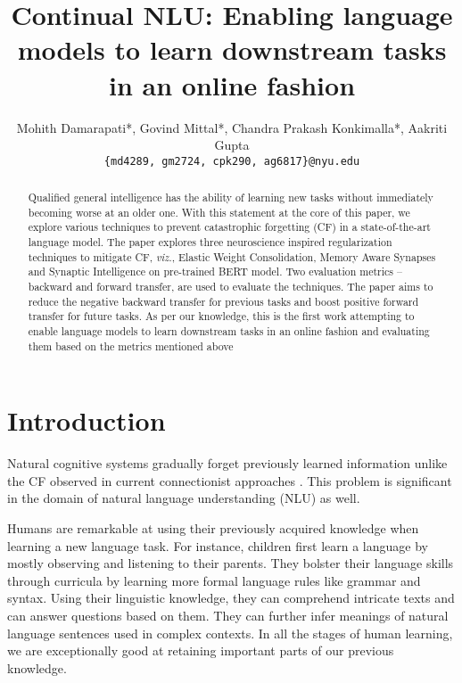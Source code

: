 \documentclass[11pt,a4paper]{article}
\title{Continual NLU: Enabling language models to learn downstream tasks in an online fashion}
\author{{Mohith Damarapati*, Govind Mittal*, Chandra Prakash Konkimalla*, Aakriti Gupta}\\
  {\tt \{md4289, gm2724, cpk290, ag6817\}@nyu.edu}}
\date{}
\begin{document}
\maketitle
\begin{abstract}
  Qualified general intelligence has the ability of learning new tasks without immediately becoming worse at an older one. With this statement at the core of this paper, we explore various techniques to prevent catastrophic forgetting (CF) in a state-of-the-art language model. The paper explores three neuroscience inspired regularization techniques to mitigate CF, \textit{viz.}, Elastic Weight Consolidation, Memory Aware Synapses and Synaptic Intelligence on pre-trained BERT model. Two evaluation metrics -- backward and forward transfer, are used to evaluate the techniques. The paper aims to reduce the negative backward transfer for previous tasks and boost positive forward transfer for future tasks. As per our knowledge, this is the first work attempting to enable language models to learn downstream tasks in an online fashion and evaluating them based on the metrics mentioned above
\end{abstract}


\section{Introduction}
\label{sec:intro}

Natural cognitive systems gradually forget previously learned information unlike the CF observed in current connectionist approaches \cite{french1999catastrophic}.  This problem is significant in the domain of natural language understanding (NLU) as well.  

Humans are remarkable at using their previously acquired knowledge when learning a new language task.  For instance, children first learn a language by mostly observing and listening to their parents.  They bolster their language skills through curricula by learning more formal language rules like grammar and syntax.  Using their linguistic knowledge, they can comprehend intricate texts and can answer questions based on them.  They can further infer meanings of natural language sentences used in complex contexts.  In all the stages of human learning, we are exceptionally good at retaining important parts of our previous knowledge.  
\end{document}
